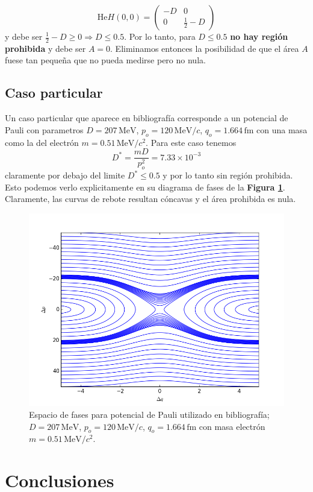 \documentclass[twoside, 12pt]{article}
\begin{document}
\[ \text{He}H(0,0) = \begin{pmatrix}
-D & 0 \\
0 & \frac{1}{2} - D
\end{pmatrix} \]
y debe ser $\frac{1}{2} - D \geq 0 \Longrightarrow D\leq 0.5$.
Por lo tanto, para $D \leq 0.5$ \textbf{no hay región prohibida} y debe ser $A=0$.
Eliminamos entonces la posibilidad de que el área $A$ fuese tan pequeña que no pueda medirse pero no nula.

\subsection{Caso particular}

Un caso particular que aparece en bibliografía corresponde a un potencial de Pauli con parametros $D=207\,\text{MeV}$, $p_o = 120\,\text{MeV}/c$, $q_o = 1.664\,\text{fm}$ con una masa como la del electrón $m=0.51\,\text{MeV}/c^2$.
Para este caso tenemos \[ D^* = \frac{mD}{p_o^2} =  7.33\times10^{-3}\] claramente por debajo del limite $D^*\leq 0.5$ y por lo tanto sin región prohibida.
Esto podemos verlo explicitamente en su diagrama de fases de la \textbf{Figura \ref{fig:fases_chinos}}.
Claramente, las curvas de rebote resultan cóncavas y el área prohibida es nula.

\begin{figure}[H]
	\centering
	\includegraphics[trim = 0mm 0mm 15mm 10mm, clip, width=0.7\columnwidth]{Fases_chino.png}
	\caption{Espacio de fases para potencial de Pauli utilizado en bibliografía; $D=207\,\text{MeV}$, $p_o = 120\,\text{MeV}/c$, $q_o = 1.664\,\text{fm}$ con masa electrón $m=0.51\,\text{MeV}/c^2$.}
	\label{fig:fases_chinos}
\end{figure}

\section{Conclusiones}
\end{document}
